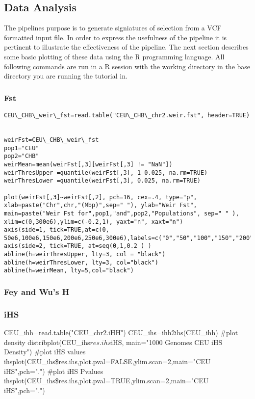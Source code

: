 \documentclass[a4paper,10pt]{article}
\begin{document}
\subsection{Data Analysis}
The pipelines purpose is to generate signiatures of selection from a VCF formatted input file. In order to express the usefulness of the pipeline it is pertinent to illustrate the effectiveness of the pipeline. The next section describes some basic plotting of these data using the R programming language. All following commands are run in a R session with the working directory in the base directory you are running the tutorial in.
\subsubsection{Fst}

\begin{verbatim}
CEU\_CHB\_weir\_fst=read.table("CEU\_CHB\_chr2.weir.fst", header=TRUE)


weirFst=CEU\_CHB\_weir\_fst
pop1="CEU"
pop2="CHB"
weirMean=mean(weirFst[,3][weirFst[,3] != "NaN"])
weirThresUpper =quantile(weirFst[,3], 1-0.025, na.rm=TRUE)
weirThresLower =quantile(weirFst[,3], 0.025, na.rm=TRUE)
         
plot(weirFst[,3]~weirFst[,2], pch=16, cex=.4, type="p", xlab=paste("Chr",chr,"(Mbp)",sep=" "), ylab="Weir Fst", main=paste("Weir Fst for",pop1,"and",pop2,"Populations", sep=" " ), xlim=c(0,300e6),ylim=c(-0.2,1), yaxt="n", xaxt="n")
axis(side=1, tick=TRUE,at=c(0, 50e6,100e6,150e6,200e6,250e6,300e6),labels=c("0","50","100","150","200","250","300"))
axis(side=2, tick=TRUE, at=seq(0,1,0.2 ) )
abline(h=weirThresUpper, lty=3, col = "black")
abline(h=weirThresLower, lty=3, col="black")
abline(h=weirMean, lty=5,col="black")
\end{verbatim}


\subsubsection{Fey and Wu's H}
\subsubsection{iHS}
CEU\_ihh=read.table("CEU\_chr2.iHH")
CEU\_ihs=ihh2ihs(CEU\_ihh)
#plot density
distribplot(CEU\_ihs$res.ihs$iHS, main="1000 Genomes CEU iHS Density")
#plot iHS values
ihsplot(CEU\_ihs\$res.ihs,plot.pval=FALSE,ylim.scan=2,main="CEU iHS",pch=".")
#plot iHS Pvalues
ihsplot(CEU\_ihs\$res.ihs,plot.pval=TRUE,ylim.scan=2,main="CEU iHS",pch=".")
\end{document}
